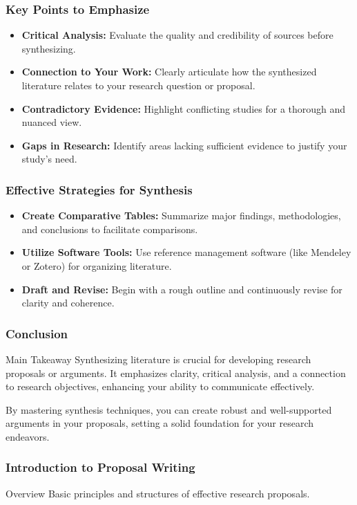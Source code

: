 \documentclass[aspectratio=169]{beamer}
\begin{document}
\begin{frame}[fragile]
    \frametitle{Key Points to Emphasize}
    \begin{itemize}
        \item \textbf{Critical Analysis:} Evaluate the quality and credibility of sources before synthesizing.
        \item \textbf{Connection to Your Work:} Clearly articulate how the synthesized literature relates to your research question or proposal.
        \item \textbf{Contradictory Evidence:} Highlight conflicting studies for a thorough and nuanced view.
        \item \textbf{Gaps in Research:} Identify areas lacking sufficient evidence to justify your study's need.
    \end{itemize}
\end{frame}

\begin{frame}[fragile]
    \frametitle{Effective Strategies for Synthesis}
    \begin{itemize}
        \item \textbf{Create Comparative Tables:} Summarize major findings, methodologies, and conclusions to facilitate comparisons.
        \item \textbf{Utilize Software Tools:} Use reference management software (like Mendeley or Zotero) for organizing literature.
        \item \textbf{Draft and Revise:} Begin with a rough outline and continuously revise for clarity and coherence.
    \end{itemize}
\end{frame}

\begin{frame}[fragile]
    \frametitle{Conclusion}
    \begin{block}{Main Takeaway}
        Synthesizing literature is crucial for developing research proposals or arguments. It emphasizes clarity, critical analysis, and a connection to research objectives, enhancing your ability to communicate effectively.
    \end{block}
    By mastering synthesis techniques, you can create robust and well-supported arguments in your proposals, setting a solid foundation for your research endeavors.
\end{frame}

\begin{frame}[fragile]
    \frametitle{Introduction to Proposal Writing}
    \begin{block}{Overview}
        Basic principles and structures of effective research proposals.
    \end{block}
\end{frame}
\end{document}

